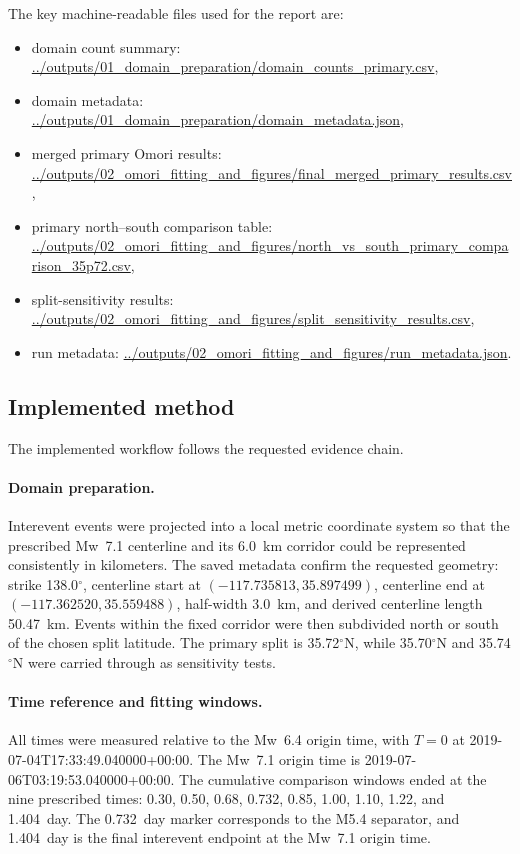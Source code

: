 \documentclass[11pt]{article}
\begin{document}
The key machine-readable files used for the report are:
\begin{itemize}[leftmargin=2em]
    \item domain count summary: \url{../outputs/01_domain_preparation/domain_counts_primary.csv},
    \item domain metadata: \url{../outputs/01_domain_preparation/domain_metadata.json},
    \item merged primary Omori results: \url{../outputs/02_omori_fitting_and_figures/final_merged_primary_results.csv},
    \item primary north--south comparison table: \url{../outputs/02_omori_fitting_and_figures/north_vs_south_primary_comparison_35p72.csv},
    \item split-sensitivity results: \url{../outputs/02_omori_fitting_and_figures/split_sensitivity_results.csv},
    \item run metadata: \url{../outputs/02_omori_fitting_and_figures/run_metadata.json}.
\end{itemize}

\subsection{Implemented method}
The implemented workflow follows the requested evidence chain.

\paragraph{Domain preparation.}
Interevent events were projected into a local metric coordinate system so that the prescribed Mw~7.1 centerline and its 6.0~km corridor could be represented consistently in kilometers. The saved metadata confirm the requested geometry: strike 138.0$^{\circ}$, centerline start at $(-117.735813,35.897499)$, centerline end at $(-117.362520,35.559488)$, half-width 3.0~km, and derived centerline length 50.47~km. Events within the fixed corridor were then subdivided north or south of the chosen split latitude. The primary split is 35.72$^{\circ}$N, while 35.70$^{\circ}$N and 35.74$^{\circ}$N were carried through as sensitivity tests.

\paragraph{Time reference and fitting windows.}
All times were measured relative to the Mw~6.4 origin time, with $T=0$ at 2019-07-04T17:33:49.040000+00:00. The Mw~7.1 origin time is 2019-07-06T03:19:53.040000+00:00. The cumulative comparison windows ended at the nine prescribed times: 0.30, 0.50, 0.68, 0.732, 0.85, 1.00, 1.10, 1.22, and 1.404~day. The 0.732~day marker corresponds to the M5.4 separator, and 1.404~day is the final interevent endpoint at the Mw~7.1 origin time.
\end{document}
